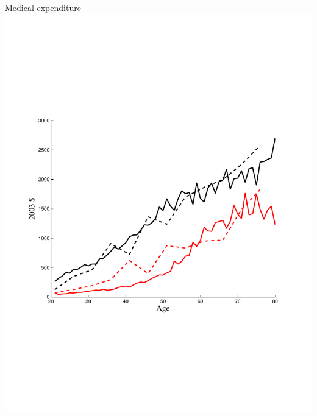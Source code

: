 \documentclass[svgnames]{beamer}
\begin{document}
\begin{frame}{Medical expenditure}
\includegraphics[width=1\textwidth, trim=0cm 0cm 0cm 5cm, clip=true]{graph/MedicalModelVsData.pdf}
\end{frame}
\end{document}
